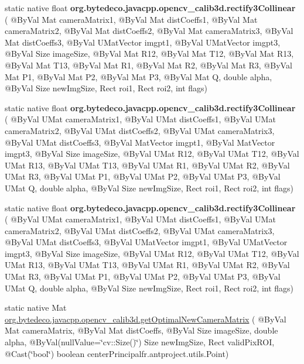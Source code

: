 \begin{DoxyCompactItemize}
\item 
\mbox{\label{group__calib3d_ga98a01b906ca3072ed6ae8a6f783b139a}} 
static native float {\bfseries org.\+bytedeco.\+javacpp.\+opencv\+\_\+calib3d.\+rectify3\+Collinear} ( @By\+Val Mat camera\+Matrix1, @By\+Val Mat dist\+Coeffs1, @By\+Val Mat camera\+Matrix2, @By\+Val Mat dist\+Coeffs2, @By\+Val Mat camera\+Matrix3, @By\+Val Mat dist\+Coeffs3, @By\+Val U\+Mat\+Vector imgpt1, @By\+Val U\+Mat\+Vector imgpt3, @By\+Val Size image\+Size, @By\+Val Mat R12, @By\+Val Mat T12, @By\+Val Mat R13, @By\+Val Mat T13, @By\+Val Mat R1, @By\+Val Mat R2, @By\+Val Mat R3, @By\+Val Mat P1, @By\+Val Mat P2, @By\+Val Mat P3, @By\+Val Mat Q, double alpha, @By\+Val Size new\+Img\+Size, Rect roi1, Rect roi2, int flags)
\item 
\mbox{\label{group__calib3d_ga176c1ca240ecc94d2720a882ebc15e5f}} 
static native float {\bfseries org.\+bytedeco.\+javacpp.\+opencv\+\_\+calib3d.\+rectify3\+Collinear} ( @By\+Val U\+Mat camera\+Matrix1, @By\+Val U\+Mat dist\+Coeffs1, @By\+Val U\+Mat camera\+Matrix2, @By\+Val U\+Mat dist\+Coeffs2, @By\+Val U\+Mat camera\+Matrix3, @By\+Val U\+Mat dist\+Coeffs3, @By\+Val Mat\+Vector imgpt1, @By\+Val Mat\+Vector imgpt3, @By\+Val Size image\+Size, @By\+Val U\+Mat R12, @By\+Val U\+Mat T12, @By\+Val U\+Mat R13, @By\+Val U\+Mat T13, @By\+Val U\+Mat R1, @By\+Val U\+Mat R2, @By\+Val U\+Mat R3, @By\+Val U\+Mat P1, @By\+Val U\+Mat P2, @By\+Val U\+Mat P3, @By\+Val U\+Mat Q, double alpha, @By\+Val Size new\+Img\+Size, Rect roi1, Rect roi2, int flags)
\item 
\mbox{\label{group__calib3d_ga7ce591d40d7287a87e7c7194ed192cd7}} 
static native float {\bfseries org.\+bytedeco.\+javacpp.\+opencv\+\_\+calib3d.\+rectify3\+Collinear} ( @By\+Val U\+Mat camera\+Matrix1, @By\+Val U\+Mat dist\+Coeffs1, @By\+Val U\+Mat camera\+Matrix2, @By\+Val U\+Mat dist\+Coeffs2, @By\+Val U\+Mat camera\+Matrix3, @By\+Val U\+Mat dist\+Coeffs3, @By\+Val U\+Mat\+Vector imgpt1, @By\+Val U\+Mat\+Vector imgpt3, @By\+Val Size image\+Size, @By\+Val U\+Mat R12, @By\+Val U\+Mat T12, @By\+Val U\+Mat R13, @By\+Val U\+Mat T13, @By\+Val U\+Mat R1, @By\+Val U\+Mat R2, @By\+Val U\+Mat R3, @By\+Val U\+Mat P1, @By\+Val U\+Mat P2, @By\+Val U\+Mat P3, @By\+Val U\+Mat Q, double alpha, @By\+Val Size new\+Img\+Size, Rect roi1, Rect roi2, int flags)
\item 
static native Mat \hyperlink{group__calib3d_ga70615047cb056a5e3787ce151ddef307}{org.\+bytedeco.\+javacpp.\+opencv\+\_\+calib3d.\+get\+Optimal\+New\+Camera\+Matrix} ( @By\+Val Mat camera\+Matrix, @By\+Val Mat dist\+Coeffs, @By\+Val Size image\+Size, double alpha, @By\+Val(null\+Value=\char`\"{}cv\+::\+Size()\char`\"{}) Size new\+Img\+Size, Rect valid\+Pix\+R\+OI, @Cast(\char`\"{}bool\char`\"{}) boolean center\+Principal\+fr.antproject.utils.Point)

\end{DoxyCompactItemize}
